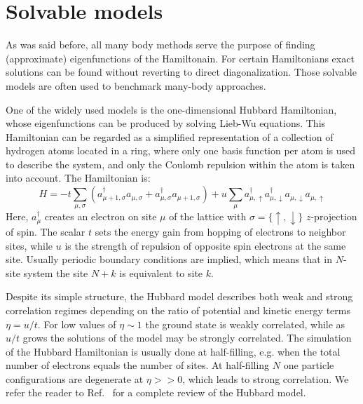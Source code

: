 \section{Solvable models
\label{sec:hubbard_hamiltonian}}
As was said before, all many body methods serve the purpose of finding 
(approximate) eigenfunctions of the Hamiltonain. For certain 
Hamiltonians exact solutions can be found without reverting to direct 
diagonalization.\cite{dukelsky2004colloquium} Those solvable models are often 
used to benchmark many-body approaches.

One of the widely used models is the one-dimensional Hubbard 
Hamiltonian, whose eigenfunctions can be produced by solving Lieb-Wu 
equations.\cite{lieb1968absence} This Hamiltonian can be regarded as a 
simplified representation of a collection of hydrogen atoms located in a 
ring, where only one basis function per atom is used to describe the system, 
and only the Coulomb repulsion within the atom is taken into account. 
The Hamiltonian is:
\begin{equation}
 H = - t \sum_{\mu, \sigma} (a^\dagger_{\mu + 1, \sigma} a_{\mu, 
\sigma} + a^\dagger_{\mu, \sigma} a_{\mu + 1, 
\sigma}) + u \sum_{\mu} a^\dagger_{\mu, \uparrow} a^\dagger_{\mu, \downarrow} 
a_{\mu, \downarrow} a_{\mu, \uparrow}
\end{equation}
Here, $a^\dagger_{\mu}$ creates an electron on site $\mu$ of the lattice with 
$\sigma = \{ \uparrow, \downarrow \}$ $z$-projection of
spin. The scalar $t$ sets the energy gain from hopping of electrons to neighbor 
sites, while $u$ is the strength of repulsion of opposite spin electrons 
at the same site. Usually periodic boundary conditions are implied, which means 
that in $N$-site system the site $N + k$ is equivalent to site $k$.

Despite its simple structure, the Hubbard model describes both weak and strong 
correlation regimes depending on the ratio of potential and kinetic energy 
terms $\eta = u / t$. For low values of $\eta \sim 1$ the ground state is 
weakly correlated, while as $u / t$ grows the solutions of the model may be 
strongly correlated. The simulation of the Hubbard Hamiltonian is usually done 
at half-filling, e.g. when the total number of electrons equals the number of 
sites. At half-filling $N$ one particle configurations are degenerate at $\eta 
>> 0$, which leads to strong correlation. We refer the reader to 
Ref.~\cite{essler2005one} for a complete review of the Hubbard model.
